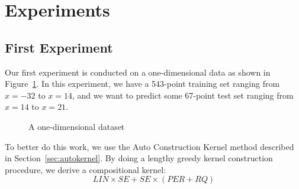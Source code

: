 \section{Experiments} \label{sec:experiment}


\subsection{First Experiment}

Our first experiment is conducted on a one-dimensional data as shown in Figure~\ref{fig:data1}. In this experiment, we have a 543-point training set ranging from $x = -32$ to $x = 14$, and we want to predict some 67-point test set ranging from $x = 14$ to $x = 21$.

\begin{figure}[htp]
\begin{minipage}[htp]{1\linewidth}
	\centering
\caption{A one-dimensional dataset}
\label{fig:data1} %
\end{minipage}
\vspace{-0.05in}
\end{figure}

To better do this work, we use the Auto Construction Kernel method described in Section~\ref{sec:autokernel}.
By doing a lengthy greedy kernel construction procedure, we derive a compositional kernel:
\begin{equation}
LIN \times SE + SE \times ( PER + RQ )
\end{equation}

